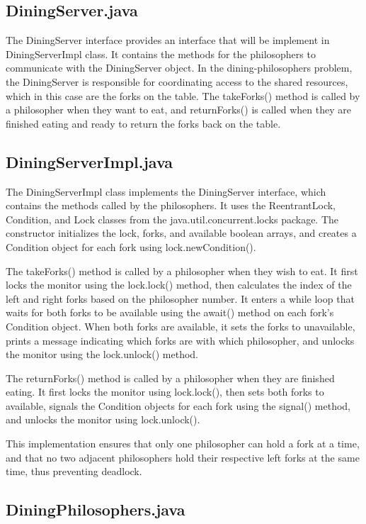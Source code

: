 \documentclass{article}
\begin{document}
\subsection{DiningServer.java}

The DiningServer interface provides an interface that will be implement in DiningServerImpl class. It contains the methods for the philosophers to communicate with the DiningServer object. In the dining-philosophers problem, the DiningServer is responsible for coordinating access to the shared resources, which in this case are the forks on the table. The takeForks() method is called by a philosopher when they want to eat, and returnForks() is called when they are finished eating and ready to return the forks back on the table.

\subsection{DiningServerImpl.java}

The DiningServerImpl class implements the DiningServer interface, which contains the methods called by the philosophers. It uses the ReentrantLock, Condition, and Lock classes from the java.util.concurrent.locks package. The constructor initializes the lock, forks, and available boolean arrays, and creates a Condition object for each fork using lock.newCondition().

The takeForks() method is called by a philosopher when they wish to eat. It first locks the monitor using the lock.lock() method, then calculates the index of the left and right forks based on the philosopher number. It enters a while loop that waits for both forks to be available using the await() method on each fork's Condition object. When both forks are available, it sets the forks to unavailable, prints a message indicating which forks are with which philosopher, and unlocks the monitor using the lock.unlock() method.

The returnForks() method is called by a philosopher when they are finished eating. It first locks the monitor using lock.lock(), then sets both forks to available, signals the Condition objects for each fork using the signal() method, and unlocks the monitor using lock.unlock().

This implementation ensures that only one philosopher can hold a fork at a time, and that no two adjacent philosophers hold their respective left forks at the same time, thus preventing deadlock.
\subsection{DiningPhilosophers.java}
\end{document}
